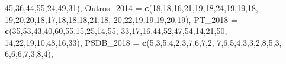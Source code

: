 \documentclass[
]{article}
\newenvironment{Shaded}{\begin{snugshade}}{\end{snugshade}}
\newcommand{\AttributeTok}[1]{\textcolor[rgb]{0.13,0.29,0.53}{#1}}
\newcommand{\DecValTok}[1]{\textcolor[rgb]{0.00,0.00,0.81}{#1}}
\newcommand{\FunctionTok}[1]{\textcolor[rgb]{0.13,0.29,0.53}{\textbf{#1}}}
\newcommand{\NormalTok}[1]{#1}
\begin{document}
\begin{Shaded}
\begin{Highlighting}[]
                \DecValTok{45}\NormalTok{,}\DecValTok{36}\NormalTok{,}\DecValTok{44}\NormalTok{,}\DecValTok{55}\NormalTok{,}\DecValTok{24}\NormalTok{,}\DecValTok{49}\NormalTok{,}\DecValTok{31}\NormalTok{),}
  \AttributeTok{Outros\_2014 =} \FunctionTok{c}\NormalTok{(}\DecValTok{18}\NormalTok{,}\DecValTok{18}\NormalTok{,}\DecValTok{16}\NormalTok{,}\DecValTok{21}\NormalTok{,}\DecValTok{19}\NormalTok{,}\DecValTok{18}\NormalTok{,}\DecValTok{24}\NormalTok{,}\DecValTok{19}\NormalTok{,}\DecValTok{19}\NormalTok{,}\DecValTok{18}\NormalTok{,}
                  \DecValTok{19}\NormalTok{,}\DecValTok{20}\NormalTok{,}\DecValTok{20}\NormalTok{,}\DecValTok{18}\NormalTok{,}\DecValTok{17}\NormalTok{,}\DecValTok{18}\NormalTok{,}\DecValTok{18}\NormalTok{,}\DecValTok{18}\NormalTok{,}\DecValTok{21}\NormalTok{,}\DecValTok{18}\NormalTok{,}
                  \DecValTok{20}\NormalTok{,}\DecValTok{22}\NormalTok{,}\DecValTok{19}\NormalTok{,}\DecValTok{19}\NormalTok{,}\DecValTok{19}\NormalTok{,}\DecValTok{20}\NormalTok{,}\DecValTok{19}\NormalTok{),}
  \AttributeTok{PT\_2018  =} \FunctionTok{c}\NormalTok{(}\DecValTok{35}\NormalTok{,}\DecValTok{53}\NormalTok{,}\DecValTok{43}\NormalTok{,}\DecValTok{40}\NormalTok{,}\DecValTok{60}\NormalTok{,}\DecValTok{55}\NormalTok{,}\DecValTok{15}\NormalTok{,}\DecValTok{25}\NormalTok{,}\DecValTok{14}\NormalTok{,}\DecValTok{55}\NormalTok{,}
               \DecValTok{33}\NormalTok{,}\DecValTok{17}\NormalTok{,}\DecValTok{16}\NormalTok{,}\DecValTok{44}\NormalTok{,}\DecValTok{52}\NormalTok{,}\DecValTok{47}\NormalTok{,}\DecValTok{54}\NormalTok{,}\DecValTok{14}\NormalTok{,}\DecValTok{21}\NormalTok{,}\DecValTok{50}\NormalTok{,}
               \DecValTok{14}\NormalTok{,}\DecValTok{22}\NormalTok{,}\DecValTok{19}\NormalTok{,}\DecValTok{10}\NormalTok{,}\DecValTok{48}\NormalTok{,}\DecValTok{16}\NormalTok{,}\DecValTok{33}\NormalTok{),}
  \AttributeTok{PSDB\_2018 =} \FunctionTok{c}\NormalTok{(}\DecValTok{5}\NormalTok{,}\DecValTok{3}\NormalTok{,}\DecValTok{5}\NormalTok{,}\DecValTok{4}\NormalTok{,}\DecValTok{2}\NormalTok{,}\DecValTok{3}\NormalTok{,}\DecValTok{7}\NormalTok{,}\DecValTok{6}\NormalTok{,}\DecValTok{7}\NormalTok{,}\DecValTok{2}\NormalTok{,}
                \DecValTok{7}\NormalTok{,}\DecValTok{6}\NormalTok{,}\DecValTok{5}\NormalTok{,}\DecValTok{4}\NormalTok{,}\DecValTok{3}\NormalTok{,}\DecValTok{3}\NormalTok{,}\DecValTok{2}\NormalTok{,}\DecValTok{8}\NormalTok{,}\DecValTok{5}\NormalTok{,}\DecValTok{3}\NormalTok{,}
                \DecValTok{6}\NormalTok{,}\DecValTok{6}\NormalTok{,}\DecValTok{6}\NormalTok{,}\DecValTok{7}\NormalTok{,}\DecValTok{3}\NormalTok{,}\DecValTok{8}\NormalTok{,}\DecValTok{4}\NormalTok{),}

\end{Highlighting}
\end{Shaded}
\end{document}

